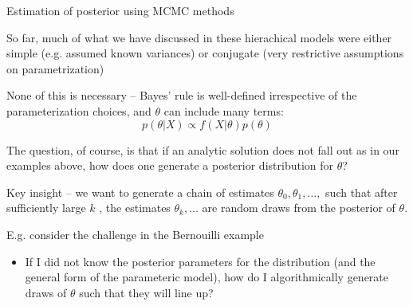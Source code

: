 \documentclass[notes,11pt, aspectratio=169]{beamer}
\newenvironment{wideitemize}{\itemize\addtolength{\itemsep}{10pt}}{\enditemize}
\begin{document}
\begin{frame}{Estimation of posterior using MCMC methods}
  \begin{wideitemize}
  \item So far, much of what we have discussed in these hierachical
    models were either simple (e.g. assumed known variances) or
    conjugate (very restrictive assumptions on parametrization)
  \item None of this is necessary -- Bayes' rule is well-defined
    irrespective of the parameterization choices, and $\theta$ can include many terms:
    \begin{equation*}
      p(\theta | X) \propto f(X | \theta) p(\theta)
    \end{equation*}
  \item The question, of course, is that if an analytic solution does
    not fall out as in our examples above, how does one generate a
    posterior distribution for $\theta$?
  \item Key insight -- we want to generate a chain of estimates
    $\theta_{0}, \theta_{1}, \ldots,$ such that after sufficiently
    large $k$ , the estimates $\theta_{k}, \ldots$ are random draws
    from the posterior of $\theta$.
  \item E.g. consider the challenge in the Bernouilli example
    \begin{itemize}
    \item If I did not know the posterior parameters for the distribution (and the general form of the parameteric model), how do I algorithmically generate draws of $\theta$ such that they will line up?
    \end{itemize}
  \end{wideitemize}
\end{frame}
\end{document}
